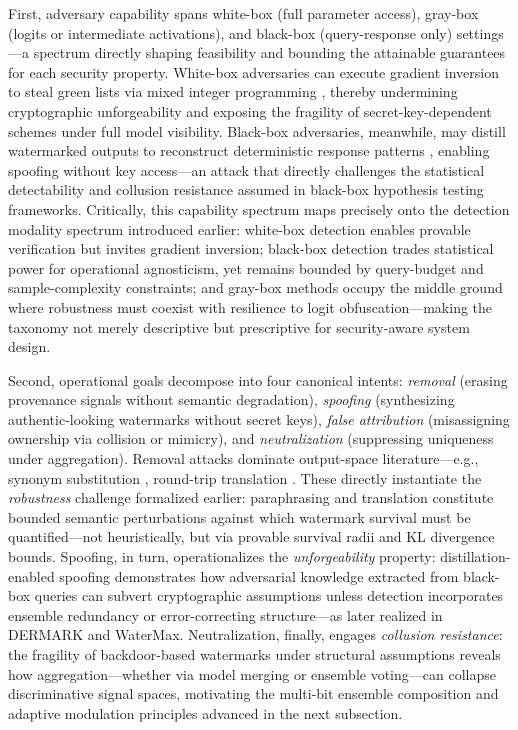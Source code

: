 \documentclass[11pt,a4paper]{article}
\begin{document}
First, adversary capability spans white-box (full parameter access), gray-box (logits or intermediate activations), and black-box (query-response only) settings---a spectrum directly shaping feasibility and bounding the attainable guarantees for each security property. White-box adversaries can execute gradient inversion to steal green lists via mixed integer programming \cite{arxiv:2405.19677}, thereby undermining cryptographic unforgeability and exposing the fragility of secret-key-dependent schemes under full model visibility. Black-box adversaries, meanwhile, may distill watermarked outputs to reconstruct deterministic response patterns \cite{arxiv:2402.19361}, enabling spoofing without key access---an attack that directly challenges the statistical detectability and collusion resistance assumed in black-box hypothesis testing frameworks. Critically, this capability spectrum maps precisely onto the detection modality spectrum introduced earlier: white-box detection enables provable verification but invites gradient inversion; black-box detection trades statistical power for operational agnosticism, yet remains bounded by query-budget and sample-complexity constraints; and gray-box methods occupy the middle ground where robustness must coexist with resilience to logit obfuscation---making the taxonomy not merely descriptive but prescriptive for security-aware system design.

Second, operational goals decompose into four canonical intents: \emph{removal} (erasing provenance signals without semantic degradation), \emph{spoofing} (synthesizing authentic-looking watermarks without secret keys), \emph{false attribution} (misassigning ownership via collision or mimicry), and \emph{neutralization} (suppressing uniqueness under aggregation). Removal attacks dominate output-space literature---e.g., synonym substitution \cite{arxiv:2505.02884}, round-trip translation \cite{arxiv:2402.14007}. These directly instantiate the \emph{robustness} challenge formalized earlier: paraphrasing and translation constitute bounded semantic perturbations against which watermark survival must be quantified---not heuristically, but via provable survival radii and KL divergence bounds. Spoofing, in turn, operationalizes the \emph{unforgeability} property: distillation-enabled spoofing \cite{arxiv:2402.19361} demonstrates how adversarial knowledge extracted from black-box queries can subvert cryptographic assumptions unless detection incorporates ensemble redundancy or error-correcting structure---as later realized in DERMARK and WaterMax. Neutralization, finally, engages \emph{collusion resistance}: the fragility of backdoor-based watermarks under structural assumptions \cite{arxiv:2409.06130} reveals how aggregation---whether via model merging or ensemble voting---can collapse discriminative signal spaces, motivating the multi-bit ensemble composition and adaptive modulation principles advanced in the next subsection.
\end{document}
